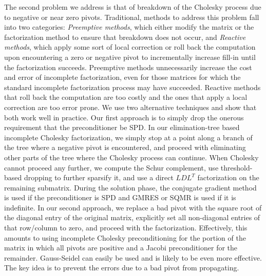 \documentclass{report}
\begin{document}
The second problem we address is that of breakdown of the Cholesky
process due to negative or near zero pivots. Traditional, methods
to address this problem fall into two categories:
{\em Preemptive methods}, which either modify the matrix or the
factorization method to ensure that breakdown does not occur, and
{\em Reactive methods}, which apply some sort of local correction or roll
back the computation upon encountering a zero or negative pivot
to incrementally increase fill-in until the factorization succeeds.
Preemptive methods unnecessarily increase the cost and error of incomplete
factorization, even for those matrices for which the standard
incomplete factorization process may have succeeded. Reactive methods
that roll back the computation are too costly and the ones that apply
a local correction are too error prone. We use two alternative techniques
and show that both work well in practice. Our first approach is to
simply drop the onerous requirement that the preconditioner be
SPD. In our elimination-tree based incomplete Cholesky factorization,
we simply stop at a point along a branch of the tree where a negative
pivot is encountered, and proceed with eliminating other parts of the
tree where the Cholesky process can continue. When Cholesky cannot proceed
any further, we compute the Schur complement, use threshold-based dropping
to further sparsify it, and use a direct $LDL^T$ factorization on the
remaining submatrix. During the solution phase, the conjugate gradient
method is used if the preconditioner is SPD and GMRES
or SQMR is used if it is indefinite. In our second approach,
we replace a bad pivot with the square root of the diagonal
entry of the original matrix, explicitly set all non-diagonal entries
of that row/column to zero, and proceed with the factorization. Effectively,
this amounts to using incomplete Cholesky preconditioning
for the portion of the matrix in which all pivots are positive and a
Jacobi preconditioner for the remainder. Gauss-Seidel can easily be
used and is likely to be even more effective. The key idea is to prevent the
errors due to a bad pivot from propagating.
\end{document}
